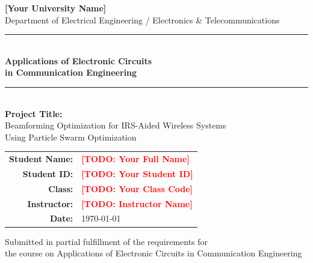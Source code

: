 \documentclass[12pt, a4paper]{article}
\newcommand{\TODO}[1]{\textcolor{red}{\textbf{[TODO: #1]}}}  %
\begin{document}
\begin{titlepage}
    \centering
    \vspace*{1cm}

    {\Large \textbf{[Your University Name]}}\\[0.3cm]
    {\large Department of Electrical Engineering / Electronics \& Telecommunications}\\[2cm]

    \rule{\linewidth}{0.5mm}\\[0.4cm]
    {\LARGE \textbf{Applications of Electronic Circuits\\[0.3cm]
    in Communication Engineering}}\\[0.3cm]
    \rule{\linewidth}{0.5mm}\\[1.5cm]

    {\large \textbf{Project Title:}}\\[0.3cm]
    {\Large Beamforming Optimization for IRS-Aided Wireless Systems\\
    Using Particle Swarm Optimization}\\[2cm]   %

    \begin{tabular}{rl}
        \textbf{Student Name:}  & \TODO{Your Full Name} \\[0.2cm]
        \textbf{Student ID:}    & \TODO{Your Student ID} \\[0.2cm]
        \textbf{Class:}         & \TODO{Your Class Code} \\[0.2cm]
        \textbf{Instructor:}    & \TODO{Instructor Name} \\[0.2cm]
        \textbf{Date:}          & \today \\
    \end{tabular}

    \vfill
    {\small Submitted in partial fulfillment of the requirements for\\
    the course on Applications of Electronic Circuits in Communication Engineering}
\end{titlepage}

\begin{abstract}
This report presents the study and implementation of beamforming optimization
for an Intelligent Reflecting Surface (IRS) aided wireless communication system.
We first review the practical phase shift model proposed by Abeywickrama \textit{et al.}
\cite{abeywickrama2020}, which captures the amplitude-phase coupling in IRS reflecting
elements -- a critical hardware imperfection ignored by most prior work.
We then apply \textbf{Particle Swarm Optimization (PSO)}
to jointly optimize the transmit beamforming at the access point and the
IRS phase shifts, with the goal of maximizing the achievable spectral efficiency.
Simulation results are compared against the Alternating Optimization (AO)
baseline reported in the original paper.
Our results show that \TODO{summarize your key finding here after running simulations}.
\end{abstract}
\end{document}
